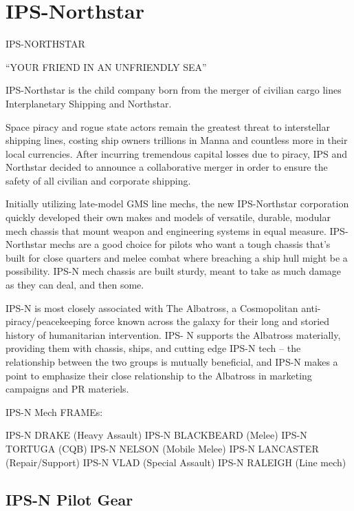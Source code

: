 \section{IPS-Northstar}

  IPS-NORTHSTAR   

                              “YOUR FRIEND IN AN UNFRIENDLY SEA”  

IPS-Northstar is the child company born from the merger of civilian cargo lines  
Interplanetary Shipping and Northstar.  

Space piracy and rogue state actors remain the greatest threat to interstellar shipping lines,  
costing ship owners trillions in Manna and countless more in their local currencies. After incurring  
tremendous capital losses due to piracy, IPS and Northstar decided to announce a collaborative  
merger in order to ensure the safety of all civilian and corporate shipping.   

Initially utilizing late-model GMS line mechs, the new IPS-Northstar corporation quickly  
developed their own makes and models of versatile, durable, modular mech chassis that mount  
weapon and engineering systems in equal measure. IPS-Northstar mechs are a good choice for  
pilots who want a tough chassis that’s built for close quarters and melee combat where breaching  
a ship hull might be a possibility. IPS-N mech chassis are built sturdy, meant to take as much  
damage as they can deal, and then some.    

IPS-N is most closely associated with The Albatross, a Cosmopolitan anti-piracy/peacekeeping  
force known across the galaxy for their long and storied history of humanitarian intervention. IPS- 
N supports the Albatross materially, providing them with chassis, ships, and cutting edge IPS-N  
tech -- the relationship between the two groups is mutually beneficial, and IPS-N makes a point  
to emphasize their close relationship to the Albatross in marketing campaigns and PR materiels.   

IPS-N Mech FRAMEs: 
 
IPS-N DRAKE (Heavy Assault)  
IPS-N BLACKBEARD (Melee)  
IPS-N TORTUGA (CQB)  
IPS-N NELSON (Mobile Melee)  
IPS-N LANCASTER (Repair/Support)  
IPS-N VLAD (Special Assault)  
IPS-N RALEIGH (Line mech)  

                                                                                                          
\subsection{IPS-N Pilot Gear}


